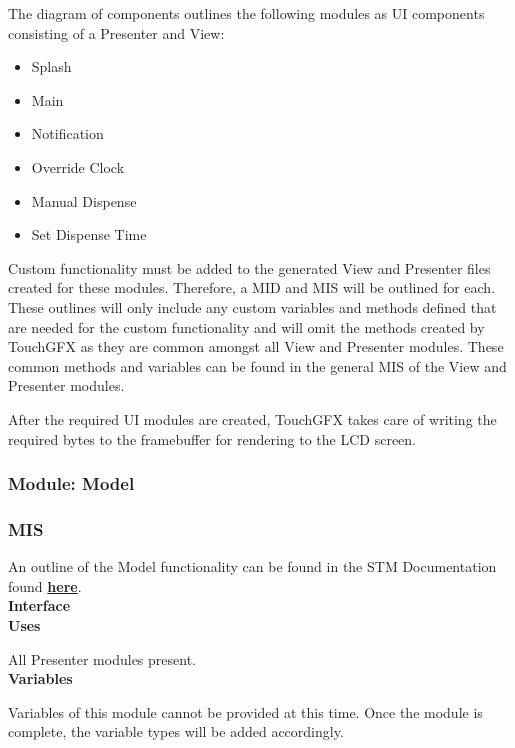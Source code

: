 \documentclass[12pt,titlepage]{article}
\begin{document}
The diagram of components outlines the following modules as UI components consisting of a Presenter and View:

\begin{itemize}
    \item Splash
    \item Main
    \item Notification
    \item Override Clock
    \item Manual Dispense
    \item Set Dispense Time
\end{itemize}

Custom functionality must be added to the generated View and Presenter files created for these modules. Therefore, a MID and MIS will be outlined for each. These outlines will only include any custom variables and methods defined that are needed for the custom functionality and will omit the methods created by TouchGFX as they are common amongst all View and Presenter modules. These common methods and variables can be found in the general MIS of the View and Presenter modules.

After the required UI modules are created, TouchGFX takes care of writing the required bytes to the framebuffer for rendering to the LCD screen.

\subsubsection{Module: Model}
\subsubsection*{MIS}

\noindent An outline of the Model functionality can be found in the STM Documentation found \textbf{\href{https://support.touchgfx.com/docs/development/ui-development/software-architecture/screen-definition-and-mvp/#model}{here}}. \\

\noindent \textbf{Interface} \\

\noindent \textbf{Uses}

\noindent All Presenter modules present. \\

\noindent \textbf{Variables}

\noindent Variables of this module cannot be provided at this time. Once the module is complete, the variable types will be added accordingly. \\
\end{document}
